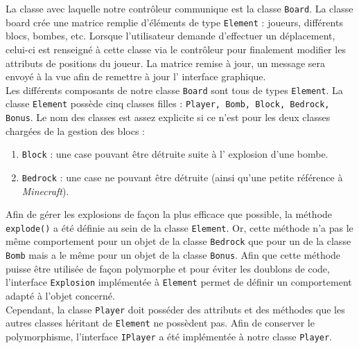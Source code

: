         La classe avec laquelle notre contrôleur communique est la classe 
        \texttt{Board}. La classe board crée une matrice remplie d'éléments 
        de type \texttt{Element} : joueurs, différents blocs, bombes, etc. 
        Lorsque l'utilisateur demande d'effectuer un déplacement, celui-ci 
        est renseigné à cette classe via le contr\^oleur pour finalement 
        modifier les attributs de positions du joueur. La matrice remise à 
        jour, un message sera envoyé à la vue afin de remettre à jour l'
        interface graphique.\\
        
        Les différents composants de notre classe \texttt{Board} sont tous 
        de types \texttt{Element}. La classe \texttt{Element} possède cinq 
        classes filles : \texttt{Player, Bomb, Block, Bedrock, Bonus}. Le 
        nom des classes est assez explicite si ce n'est pour les deux classes 
        chargées de la gestion des blocs :
        \begin{enumerate}
        \item \texttt{Block} : une case pouvant \^etre détruite suite à l'
        explosion d'une bombe.
        \item \texttt{Bedrock} : une case ne pouvant \^etre détruite (ainsi 
        qu'une petite référence à \textit{Minecraft}).
        \end{enumerate}
        
        Afin de gérer les explosions de façon la plus efficace que possible, 
        la méthode \texttt{explode()} a été définie au sein de la classe 
        \texttt{Element}. Or, cette méthode n'a pas le même comportement pour
        un objet de la classe \texttt{Bedrock} que pour un de la classe \texttt{Bomb} 
        mais a le m\^eme pour un objet de la classe \texttt{Bonus}. 
        Afin que cette méthode puisse être utilisée de façon polymorphe et pour
        éviter les doublons de code, l'interface \texttt{Explosion} implémentée 
        à \texttt{Element} permet de définir un comportement adapté à l'objet
        concerné.\\
        
		Cependant, la classe \texttt{Player} doit posséder des attributs et 
		des méthodes que les autres classes héritant de \texttt{Element} ne 
		possèdent pas. Afin de conserver le polymorphisme, l'interface 
		\texttt{IPlayer} a été implémentée à notre classe \texttt{Player}.
        
